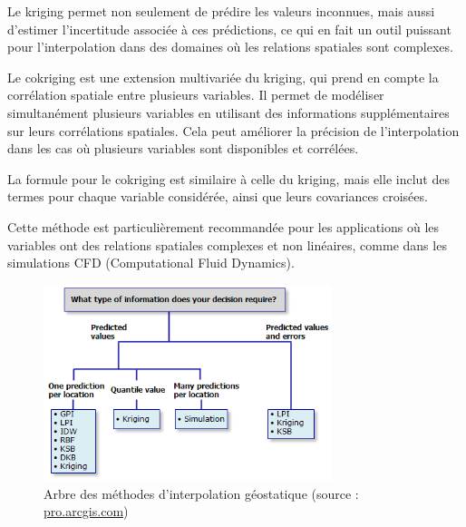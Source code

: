 Le kriging permet non seulement de prédire les valeurs inconnues, mais aussi d'estimer l'incertitude associée à ces prédictions, ce qui en fait un outil puissant pour l'interpolation dans des domaines où les relations spatiales sont complexes.

Le cokriging est une extension multivariée du kriging, qui prend en compte la corrélation spatiale entre plusieurs variables. Il permet de modéliser simultanément plusieurs variables en utilisant des informations supplémentaires sur leurs corrélations spatiales. Cela peut améliorer la précision de l'interpolation dans les cas où plusieurs variables sont disponibles et corrélées.

La formule pour le cokriging est similaire à celle du kriging, mais elle inclut des termes pour chaque variable considérée, ainsi que leurs covariances croisées.

Cette méthode est particulièrement recommandée pour les applications où les variables ont des relations spatiales complexes et non linéaires, comme dans les simulations CFD (Computational Fluid Dynamics).




\begin{figure}[H]
    \centering
    \includegraphics[width=0.75\textwidth]{images/arcgis.png}
    \caption{Arbre des méthodes d'interpolation géostatique (source : \href{https://pro.arcgis.com/fr/pro-app/latest/help/analysis/geostatistical-analyst/classification-trees-of-the-interpolation-methods-offered-in-geostatistical-analyst.htm}{pro.arcgis.com})}
    \label{fig:arcgis}
\end{figure}


